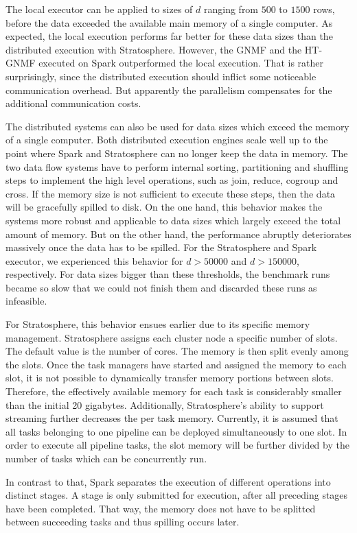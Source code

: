 The local executor can be applied to sizes of $d$ ranging from $500$ to $1500$ rows, before the data exceeded the available main memory of a single computer.
As expected, the local execution performs far better for these data sizes than the distributed execution with Stratosphere.
However, the GNMF and the HT-GNMF executed on Spark outperformed the local execution.
That is rather surprisingly, since the distributed execution should inflict some noticeable communication overhead.
But apparently the parallelism compensates for the additional communication costs.

The distributed systems can also be used for data sizes which exceed the memory of a single computer.
Both distributed execution engines scale well up to the point where Spark and Stratosphere can no longer keep the data in memory.
The two data flow systems have to perform internal sorting, partitioning and shuffling steps to implement the high level operations, such as join, reduce, cogroup and cross.
If the memory size is not sufficient to execute these steps, then the data will be gracefully spilled to disk.
On the one hand, this behavior makes the systems more robust and applicable to data sizes which largely exceed the total amount of memory.
But on the other hand, the performance abruptly deteriorates massively once the data has to be spilled.
For the Stratosphere and Spark executor, we experienced this behavior for $d>50000$ and $d>150000$, respectively.
For data sizes bigger than these thresholds, the benchmark runs became so slow that we could not finish them and discarded these runs as infeasible.

For Stratosphere, this behavior ensues earlier due to its specific memory management.
Stratosphere assigns each cluster node a specific number of slots.
The default value is the number of cores.
The memory is then split evenly among the slots.
Once the task managers have started and assigned the memory to each slot, it is not possible to dynamically transfer memory portions between slots.
Therefore, the effectively available memory for each task is considerably smaller than the initial 20 gigabytes.
Additionally, Stratosphere's ability to support streaming further decreases the per task memory.
Currently, it is assumed that all tasks belonging to one pipeline can be deployed simultaneously to one slot.
In order to execute all pipeline tasks, the slot memory will be further divided by the number of tasks which can be concurrently run.

In contrast to that, Spark separates the execution of different operations into distinct stages.
A stage is only submitted for execution, after all preceding stages have been completed.
That way, the memory does not have to be splitted between succeeding tasks and thus spilling occurs later.

